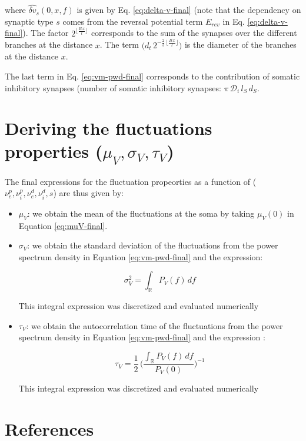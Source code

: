\documentclass[colorlinks]{article}
\begin{document}
where $ \hat{\delta v}_{s}(0, x, f)$ is given by
Eq. \ref{eq:delta-v-final} (note that the dependency on synaptic type
$s$ comes from the reversal potential term $E_{rev}$ in
Eq. \ref{eq:delta-v-final}). The factor $2^{\lfloor \frac{B \, x}{l}
  \rfloor}$ corresponds to the sum of the synapses over the different
branches at the distance $x$. The term $\big( d_t \, 2^{- \frac{2}{3}
  \, \lfloor \frac{B \, x}{l} \rfloor} \Big)$ is the diameter of the
branches at the distance $x$.

The last term in Eq. \ref{eq:vm-pwd-final} corresponds to the
contribution of somatic inhibitory synapses (number of somatic
inhibitory synapses: $\pi \, \mathcal{D}_i \, l_{S} \, d_{S}$.

\section{Deriving the fluctuations properties ($\mu_V, \sigma_V, \tau_V$)}
\label{sec-5}

The final expressions for the fluctuation propeorties as a function of
($\nu_e^p, \nu_i^p, \nu_e^d, \nu_i^d, s$) are thus given by:

\begin{itemize}

  \item $\mu_V$: we obtain the mean of the fluctuations at the soma by
    taking $\mu_V(0)$ in Equation \ref{eq:muV-final}.

  \item $\sigma_V$: we obtain the standard deviation of the fluctuations from the power spectrum density in Equation \ref{eq:vm-pwd-final} and the expression:

    \begin{equation}
      \label{eq:var-expr}
      \sigma_V^2 = \int_\mathbb{R} P_V(f) \, df
    \end{equation}

    This integral expression was discretized and evaluated numerically

  \item $\tau_V$: we obtain the autocorrelation time of the
    fluctuations from the power spectrum density in Equation
    \ref{eq:vm-pwd-final} and the expression \cite{Zerlaut2016}:

    \begin{equation}
      \label{eq:Tv-def-with-pwd}
      \tau_V = \frac{1}{2} \, \big( \frac{\int_\mathbb{R} P_V(f) \, d f}{ P_V(0) } \big)^{-1}
    \end{equation}
    
    This integral expression was discretized and evaluated numerically
    
\end{itemize}


\section{References}
\label{sec-5}

\end{document}
